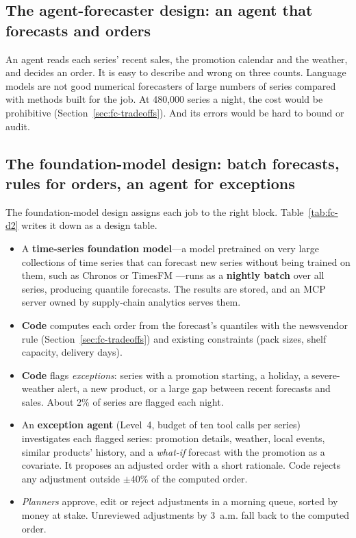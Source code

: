 \subsection{The agent-forecaster design: an agent that forecasts and orders}

An agent reads each series' recent sales, the promotion calendar and the weather, and decides an order. It is easy to describe and wrong on three counts. Language models are not good numerical forecasters of large numbers of series compared with methods built for the job. At 480{,}000 series a night, the cost would be prohibitive (Section~\ref{sec:fc-tradeoffs}). And its errors would be hard to bound or audit.

\subsection{The foundation-model design: batch forecasts, rules for orders, an agent for exceptions}

The foundation-model design assigns each job to the right block. Table~\ref{tab:fc-d2} writes it down as a design table.
\begin{itemize}[itemsep=1pt]
  \item A \textbf{time-series foundation model}---a model pretrained on very large collections of time series that can forecast new series without being trained on them, such as Chronos or TimesFM \citep{ansari2024chronos,das2024timesfm}---runs as a \textbf{nightly batch} over all series, producing quantile forecasts. The results are stored, and an MCP server owned by supply-chain analytics serves them.
  \item \textbf{Code} computes each order from the forecast's quantiles with the newsvendor rule (Section~\ref{sec:fc-tradeoffs}) and existing constraints (pack sizes, shelf capacity, delivery days).
  \item \textbf{Code} flags \emph{exceptions}: series with a promotion starting, a holiday, a severe-weather alert, a new product, or a large gap between recent forecasts and sales. About 2\% of series are flagged each night.
  \item An \textbf{exception agent} (Level~4, budget of ten tool calls per series) investigates each flagged series: promotion details, weather, local events, similar products' history, and a \emph{what-if} forecast with the promotion as a covariate. It proposes an adjusted order with a short rationale. Code rejects any adjustment outside $\pm$40\% of the computed order.
  \item \emph{Planners} approve, edit or reject adjustments in a morning queue, sorted by money at stake. Unreviewed adjustments by 3~a.m. fall back to the computed order.
\end{itemize}

